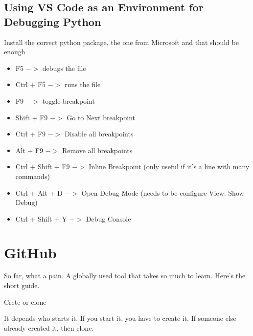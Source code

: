 \subsection{Using VS Code as an Environment for Debugging Python}
Install the correct python package, the one from Microsoft and that should be enough

\begin{itemize}
    \item F5 $->$ debugs the file
    \item Ctrl + F5 $->$ runs the file
    \item F9 $->$ toggle breakpoint
    \item Shift + F9 $->$ Go to Next breakpoint
    \item Ctrl + F9 $->$ Disable all breakpoints
    \item Alt + F9 $->$ Remove all breakpoints
    \item Ctrl + Shift + F9 $->$ Inline Breakpoint (only useful if it's a line with many commands)
    \item Ctrl + Alt + D $->$ Open Debug Mode (needs to be configure View: Show Debug)
    \item Ctrl + Shift + Y $->$ Debug Console
\end{itemize}























\section{GitHub}
\par So far, what a pain. A globally used tool that takes so much to learn. Here's the short guide.

\vspace{.5cm}

{\large Crete or clone}
\vspace{.5cm}
\par It depends who starts it. If you start it, you have to create it. If someone else already created it, then clone.

